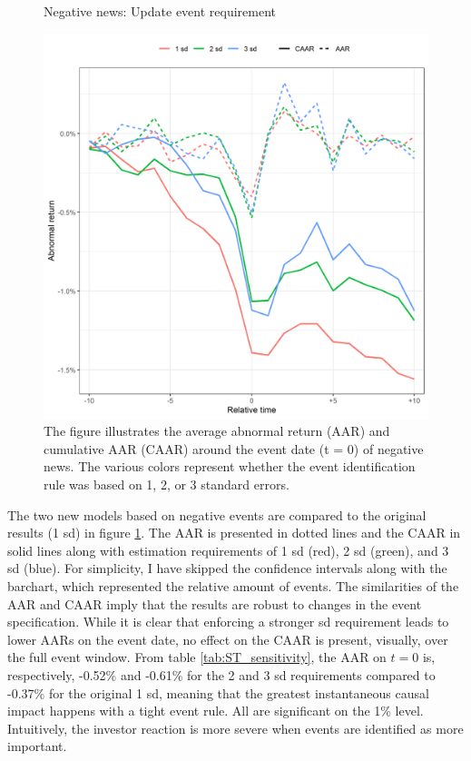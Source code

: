 \begin{figure} [h]
    \centering
    \caption{Negative news: Update event requirement}
    \includegraphics[scale=0.6]{Projekt/1.Figures analysis/ST_negative_sensitivity.png}
     \caption*{\footnotesize The figure illustrates the average abnormal return (AAR) and cumulative AAR (CAAR) around the event date (t = 0) of negative news. The various colors represent whether the event identification rule was based on 1, 2, or 3 standard errors.  }
    \label{fig:ST_neg_sensitivity}
\end{figure} 

The two new models based on negative events are compared to the original results (1 sd) in figure \ref{fig:ST_neg_sensitivity}. The AAR is presented in dotted lines and the CAAR in solid lines along with estimation requirements of 1 sd (red), 2 sd (green), and 3 sd (blue). For simplicity, I have skipped the confidence intervals along with the barchart, which represented the relative amount of events. The similarities of the AAR and CAAR imply that the results are robust to changes in the event specification. While it is clear that enforcing a stronger sd requirement leads to lower AARs on the event date, no effect on the CAAR is present, visually, over the full event window. From table \ref{tab:ST_sensitivity}, the AAR on $t=0$ is, respectively, -0.52\% and -0.61\% for the 2 and 3 sd requirements compared to -0.37\% for the original 1 sd, meaning that the greatest instantaneous causal impact happens with a tight event rule. All are significant on the 1\% level. Intuitively, the investor reaction is more severe when events are identified as more important.  



